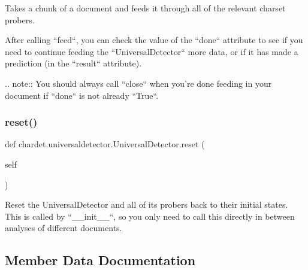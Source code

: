 \begin{DoxyVerb}Takes a chunk of a document and feeds it through all of the relevant
charset probers.

After calling ``feed``, you can check the value of the ``done``
attribute to see if you need to continue feeding the
``UniversalDetector`` more data, or if it has made a prediction
(in the ``result`` attribute).

.. note::
   You should always call ``close`` when you're done feeding in your
   document if ``done`` is not already ``True``.
\end{DoxyVerb}
 \mbox{\label{classchardet_1_1universaldetector_1_1_universal_detector_acb3d3ab019d663f32a612df4752b315d}} 
\subsubsection{\texorpdfstring{reset()}{reset()}}
{\footnotesize\ttfamily def chardet.\+universaldetector.\+Universal\+Detector.\+reset (\begin{DoxyParamCaption}\item[{}]{self }\end{DoxyParamCaption})}

\begin{DoxyVerb}Reset the UniversalDetector and all of its probers back to their
initial states.  This is called by ``__init__``, so you only need to
call this directly in between analyses of different documents.
\end{DoxyVerb}
 

\subsection{Member Data Documentation}
\mbox{\label{classchardet_1_1universaldetector_1_1_universal_detector_aff957588843f12058233c7277021472b}} 

